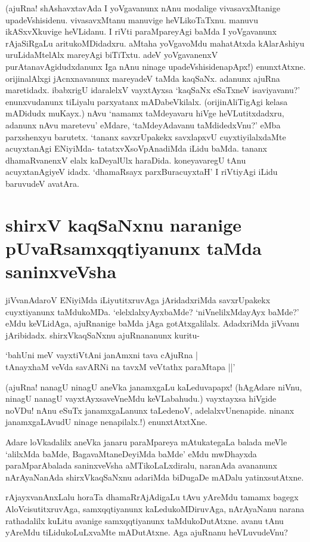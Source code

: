 (ajuRna! shAshavxtavAda I yoVgavanunx nAnu modalige vivasavxMtanige upadeVshisidenu. vivasavxMtanu manuvige heVLikoTaTxnu. manuvu ikASxvXkuvige heVLidanu. I riVti paraMpareyAgi baMda I yoVgavanunx rAjaSiRgaLu aritukoMDidadxru. aMtaha yoVgavoMdu mahatAtxda kAlarAshiyu uruLidaMtelAlx mareyAgi biTiTxtu. adeV yoVgavanenxV purAtanavAgidudxdanunx Iga nAnu ninage upadeVshisidenapApx!) enunxtAtxne. orijinalAlxgi jAcnxnavanunx mareyadeV taMda kaqSaNx. adanunx ajuRna maretidadx. ibabxrigU idaralelxV vayxtAyxsa `kaqSaNx eSaTxneV isaviyavanu?' enunxvudanunx tiLiyalu parxyatanx mADabeVkilalx. (orijinAliTigAgi kelasa mADidudx muKayx.) nAvu `namamx taMdeyavaru hiVge heVLutitxdadxru, adanunx nAvu maretevu' eMdare, `taMdeyAdavanu taMdidedxVnu?' eMba parxshenxyu barutetx. `tananx savxrUpakekx savxlapxvU cuyxtiyilalxdaMte acuyxtanAgi ENiyiMda- tatatxvXsoVpAnadiMda iLidu baMda. tananx dhamaRvanenxV elalx kaDeyalUlx haraDida. koneyavaregU tAnu acuyxtanAgiyeV idadx. `dhamaRsayx parxBuracuyxtaH'\label{90a} I riVtiyAgi iLidu baruvudeV avatAra. 

\section*{shirxV kaqSaNxnu naranige pUvaRsamxqqtiyanunx taMda saninxveVsha}

jiVvanAdaroV ENiyiMda iLiyutitxruvAga jAridadxriMda savxrUpakekx cuyxtiyanunx taMdukoMDa. `elelxlalxyAyxbaMde? `niVnelilxMdayAyx baMde?' eMdu keVLidAga, ajuRnanige baMda jAga gotAtxgalilalx. AdadxriMda jiVvanu jAribidadx. shirxVkaqSaNxnu ajuRnananunx kuritu-

\begin{shloka}
`bahUni meV vayxtiVtAni janAmxni tava cA\s juRna |\label{91a}\\
tAnayxhaM veVda savARNi na tavxM veVtathx paraMtapa ||'
\end{shloka}

(ajuRna! nanagU ninagU aneVka janamxgaLu kaLeduvapapx! (hAgAdare niVnu, ninagU nanagU vayxtAyxsaveVneMdu keVLabahudu.) vayxtayxsa hiVgide noVDu! nAnu eSuTx janamxgaLanunx taLedenoV, adelalxvUnenapide. ninanx janamxgaLAvudU ninage nenapilalx.!) enunxtAtxtXne.

Adare loVkadalilx aneVka janaru paraMpareya mAtukategaLa balada meVle `alilxMda baMde, BagavaMtaneDeyiMda baMde' eMdu mwDhayxda paraMparAbalada saninxveVsha aMTikoLaLxdiralu, naranAda avananunx nArAyaNanAda shirxVkaqSaNxnu adariMda biDugaDe mADalu yatinxsutAtxne.

rAjayxvanAnxLalu horaTa dhamaRrAjAdigaLu tAvu yAreMdu tamamx bagegx AloVcisutitxruvAga, samxqqtiyanunx kaLedukoMDiruvAga, nArAyaNanu narana rathadalilx kuLitu avanige samxqqtiyanunx taMdukoDutAtxne. avanu tAnu yAreMdu tiLidukoLuLxvaMte mADutAtxne. Aga ajuRnanu heVLuvudeVnu?


